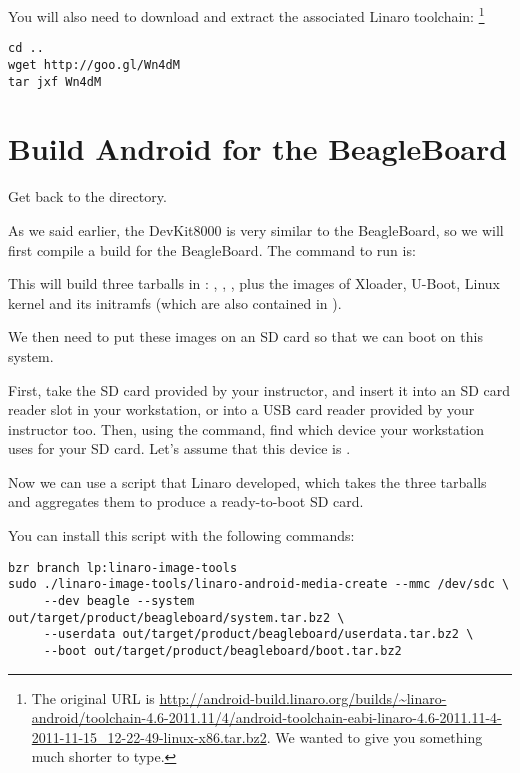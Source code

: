 You will also need to download and extract the associated Linaro toolchain:
\footnote{The original URL is
\url{http://android-build.linaro.org/builds/~linaro-android/toolchain-4.6-2011.11/4/android-toolchain-eabi-linaro-4.6-2011.11-4-2011-11-15_12-22-49-linux-x86.tar.bz2}. We wanted to give you something much shorter
to type.}
\begin{verbatim}
cd ..
wget http://goo.gl/Wn4dM
tar jxf Wn4dM
\end{verbatim}

\section{Build Android for the BeagleBoard}

Get back to the  directory.

As we said earlier, the DevKit8000 is very similar to the BeagleBoard, so we
will first compile a build for the BeagleBoard. The command to run is:


This will build three tarballs in :
, , , plus the images of Xloader,
U-Boot, Linux kernel and its initramfs (which are also contained in
).

We then need to put these images on an SD card so that we can boot on this system.

First, take the SD card provided by your instructor, and insert it into an SD card reader slot
in your workstation, or into a USB card reader provided by your instructor too. Then,
using the  command, find which device your workstation uses for your SD card.
Let's assume that this device is . 

Now we can use a  script that Linaro developed,
which takes the three tarballs and aggregates them to produce a ready-to-boot SD card.

You can install this script with the following commands:

\begin{verbatim}
bzr branch lp:linaro-image-tools
sudo ./linaro-image-tools/linaro-android-media-create --mmc /dev/sdc \
     --dev beagle --system out/target/product/beagleboard/system.tar.bz2 \
     --userdata out/target/product/beagleboard/userdata.tar.bz2 \
     --boot out/target/product/beagleboard/boot.tar.bz2
\end{verbatim}

